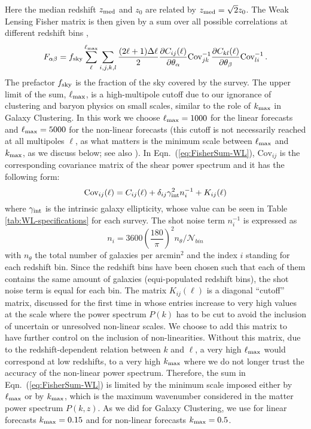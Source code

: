 Here the median redshift $z_{\rm med}$ and $z_{0}$ are related by $z_{\rm med}=\sqrt{2}z_{0}$.
The Weak Lensing Fisher matrix is then 
given by a sum over all possible correlations at different redshift bins
\citep{tegmark_measuring_1998},
\begin{equation}
F_{\alpha\beta}=f_{\rm sky}\sum_{\ell}^{\ell_{\mathrm{max}}}\sum_{i,j,k,l}\frac{(2\ell+1)\Delta\ell}{2}\frac{\partial
C_{ij}(\ell)}{\partial\theta_{\alpha}}\textrm{Cov}_{jk}^{-1}\frac{\partial
C_{kl}(\ell)}{\partial\theta_{\beta}}\textrm{Cov}_{li}^{-1} \, . \label{eq:FisherSum-WL}
\end{equation}
The prefactor $f_{\rm sky}$ is the fraction of the sky covered by the survey. The upper limit of the sum, $\ell_{\mathrm{max}}$, is a high-multipole cutoff due to our ignorance of clustering and baryon physics on small
scales, similar to the role of $k_{\rm max}$ in Galaxy Clustering. In this work we choose $\ell_{\mathrm{max}} = 1000$ for the linear forecasts and $\ell_{\mathrm{max}} = 5000$ for the
non-linear forecasts (this cutoff is not necessarily reached at all multipoles $\ell$, as what matters is the minimum scale between $\ell_{\rm max}$ and $k_{\rm max}$, as we discuss below; see also \cite{casas_fitting_2015}).
In Eqn.\ (\ref{eq:FisherSum-WL}), $\textrm{Cov}_{ij}$ is the corresponding covariance matrix of the shear power spectrum and it has the following form:
\begin{equation}
\textrm{Cov}_{ij}(\ell)=C_{ij}(\ell)+\delta_{ij}\gamma_{\rm int}^{2}n_{i}^{-1}+K_{ij}(\ell)
\end{equation}
where $\gamma_{\rm int}$ is the intrinsic galaxy ellipticity, whose value can be seen in Table \ref{tab:WL-specifications} for each survey. The
shot noise term $n_{i}^{-1}$ is expressed as
\begin{equation}
n_{i}=3600\left(\frac{180}{\pi}\right)^{2}n_{\theta}/\mathcal{N}_{bin}
\end{equation}
with $n_{\theta}$ the total number of galaxies per $\text{arcmin}^2$ and the index $i$ standing for each redshift bin.
Since the redshift bins have been chosen such that each of them contains
the same amount of galaxies (equi-populated redshift bins), the shot noise term is equal for each bin.
The matrix $K_{ij}(\ell)$
is a diagonal ``cutoff'' matrix, discussed for the first time in \cite{casas_fitting_2015} whose entries increase to very high
values at the scale where the power spectrum $P(k)$ has to be cut
to avoid the inclusion of uncertain or unresolved non-linear scales. We choose to add this matrix to have 
further control on the inclusion of non-linearities. Without this matrix, due to the redshift-dependent relation between
$k$ and $\ell$, a very high $\ell_{\mathrm{max}}$ would correspond at low redshifts, to a very high $k_{\rm max}$ where we do not longer
trust the accuracy of the non-linear power spectrum. Therefore, the sum in Eqn.\ (\ref{eq:FisherSum-WL}) is limited by the minimum scale imposed
either by $\ell_{\mathrm{max}}$ or by $k_{\rm max}$, which is the maximum wavenumber considered in the matter power spectrum $P(k,z)$. As we did for Galaxy Clustering, we use for linear forecasts $k_{\rm max}=0.15$ and for non-linear forecasts $k_{\rm max}=0.5$.

